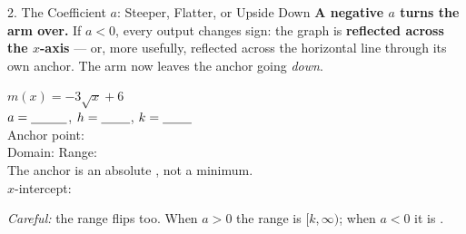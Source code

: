 \documentclass[10pt]{article}
\newcommand{\lgrid}[4]{%
  \draw[step=1, linegray!40, very thin] (#1,#3) grid (#2,#4);
  \draw[->, semithick, charcoal] (#1,0)--(#2,0) node[below right, font=\scriptsize]{$x$};
  \draw[->, semithick, charcoal] (0,#3)--(0,#4) node[left, font=\scriptsize]{$y$};}
\begin{document}
\begin{notesbox}{2. The Coefficient $a$: Steeper, Flatter, or Upside Down}
\vspace{4pt}
\textbf{A negative $a$ turns the arm over.} If $a<0$, every output changes sign: the graph is
\textbf{reflected across the $x$-axis} --- or, more usefully, reflected across the horizontal line
through its own anchor. The arm now leaves the anchor going \emph{down}.
\begin{center}
\begin{minipage}[c]{0.46\linewidth}
\centering
{}
\end{minipage}
\hfill
\begin{minipage}[c]{0.50\linewidth}
\small
$m(x)=-3\sqrt{x}+6$ \\[4pt]
$a=\blank{1.0cm}$, \; $h=\blank{0.8cm}$, \; $k=\blank{0.8cm}$ \\[4pt]
Anchor point: \blank{1.8cm} \\[4pt]
Domain: \blank{2.0cm} \quad Range: \blank{2.2cm} \\[4pt]
The anchor is an absolute \blank{1.6cm}, not a minimum. \\[4pt]
$x$-intercept: \blank{1.6cm}
\end{minipage}
\end{center}
\emph{Careful:} the range flips too. When $a>0$ the range is $[k,\infty)$; when $a<0$ it is
\blank{2.6cm}.
\end{notesbox}
\end{document}
